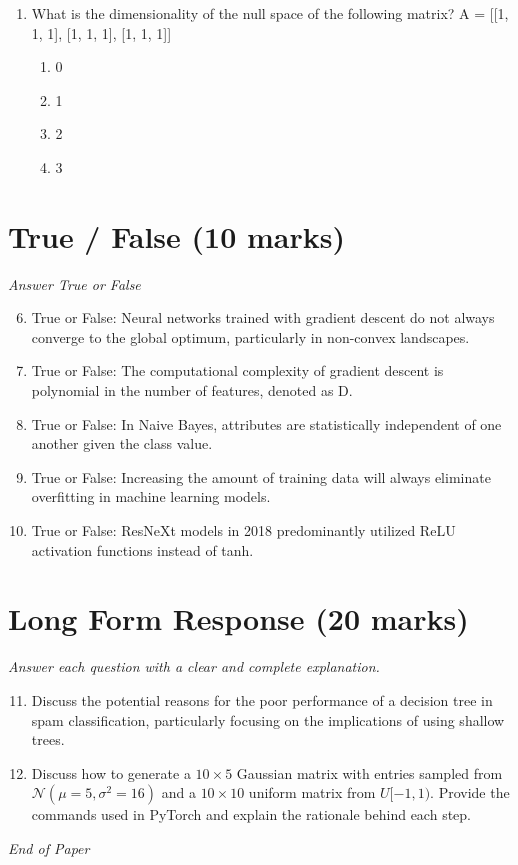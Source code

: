 \documentclass[12pt]{article}
\begin{document}
\begin{enumerate}[label=\arabic*.]
\begin{enumerate}[label=(\alph*)]
    \item O(log N )
    \item O( $N^2$ )
\end{enumerate}
\item What is the dimensionality of the null space of the following matrix? A = [[1, 1, 1], [1, 1, 1], [1, 1, 1]]
\begin{enumerate}[label=(\alph*)]
    \item 0
    \item 1
    \item 2
    \item 3
\end{enumerate}
\end{enumerate}

\section*{True / False (10 marks)}
\textit{Answer True or False}
\begin{enumerate}[label=\arabic*.]
\setcounter{enumi}{5}
\item True or False: Neural networks trained with gradient descent do not always converge to the global optimum, particularly in non-convex landscapes.
\item True or False: The computational complexity of gradient descent is polynomial in the number of features, denoted as D.
\item True or False: In Naive Bayes, attributes are statistically independent of one another given the class value.
\item True or False: Increasing the amount of training data will always eliminate overfitting in machine learning models.
\item True or False: ResNeXt models in 2018 predominantly utilized ReLU activation functions instead of tanh.
\end{enumerate}

\section*{Long Form Response (20 marks)}
\textit{Answer each question with a clear and complete explanation.}
\begin{enumerate}[label=\arabic*.]
\setcounter{enumi}{10}
\item Discuss the potential reasons for the poor performance of a decision tree in spam classification, particularly focusing on the implications of using shallow trees.
\item Discuss how to generate a $10 \times 5$ Gaussian matrix with entries sampled from $\mathcal{N}(\mu=5,\sigma^2=16)$ and a $10 \times 10$ uniform matrix from $U[-1,1)$. Provide the commands used in PyTorch and explain the rationale behind each step.
\end{enumerate}

\vfill
\noindent\textit{End of Paper}
\end{document}
